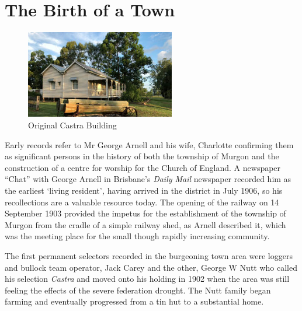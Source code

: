 \printendnotes
\setcounter{endnote}{0}
\chapter{The Birth of a Town}




\begin{figure}
\begin{center}
\includegraphics[width=0.58\textwidth,right]{images/castraOld.jpg}
\caption{Original Castra Building}
\end{center}
\end{figure}


Early records refer to Mr George Arnell and his wife, Charlotte
confirming them as significant persons in the history of both the
township of Murgon and the construction of a centre for worship for the
Church of England. A newspaper ``Chat'' with George Arnell in Brisbane's
\emph{Daily Mail} newspaper recorded him as the earliest `living
resident'\emph{,} having arrived in the district in July 1906, so his
recollections are a valuable resource today. The opening of the railway
on 14 September 1903 provided the impetus for the establishment of the
township of Murgon from the cradle of a simple railway shed, as Arnell
described it, which was the meeting place for the small though rapidly
increasing community.

The first permanent selectors recorded in the burgeoning town area were
loggers and bullock team operator, Jack Carey and the other, George W
Nutt who called his selection \emph{Castra} and moved onto his holding
in 1902 when the area was still feeling the effects of the severe
federation drought. The Nutt family began farming and eventually
progressed from a tin hut to a substantial home.

